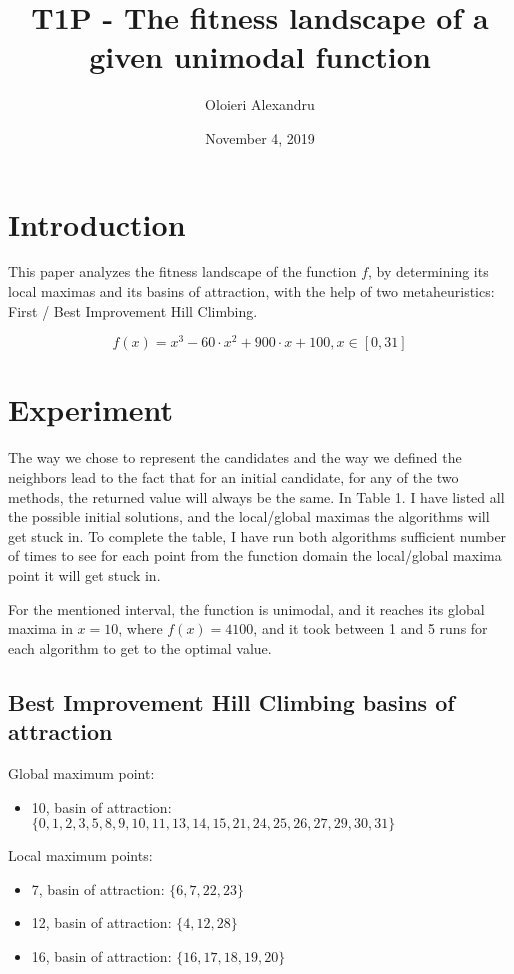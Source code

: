\documentclass[a4paper]{article}
\title{T1P - The fitness landscape of a given unimodal function}
\author{Oloieri Alexandru}
\date{November 4, 2019}
\begin{document}
	
\maketitle
	
\section{Introduction}

This paper analyzes the fitness landscape of the function $f$, by determining its local maximas and its basins of attraction, with the help of two metaheuristics: First / Best Improvement Hill Climbing.

$$f(x) = x^3 - 60 \cdot x^2 + 900 \cdot x + 100, x \in \left[0,31\right]$$

\section{Experiment}

The way we chose to represent the candidates and the way we defined the neighbors lead to the fact that for an initial candidate, for any of the two methods, the returned value will always be the same. In Table 1. I have listed all the possible initial solutions, and the local/global maximas the algorithms will get stuck in. To complete the table, I have run both algorithms sufficient number of times to see for each point from the function domain the local/global maxima point it will get stuck in.

For the mentioned interval, the function is unimodal, and it reaches its global maxima in $x=10$, where $f(x)=4100$, and it took between 1 and 5 runs for each algorithm to get to the optimal value.

\subsection{Best Improvement Hill Climbing basins of attraction}

Global maximum point: 
\begin{itemize}
	\item 10, basin of attraction: $\{0, 1, 2, 3, 5, 8, 9, 10, 11, 13, 14, 15, 21, 24, 25, 26, 27, 29, 30, 31\}$
\end{itemize}

Local maximum points:
\begin{itemize}
	\item 7, basin of attraction: $\{6, 7, 22, 23\}$
	\item 12, basin of attraction: $\{4, 12, 28\}$
	\item 16, basin of attraction: $\{16, 17, 18, 19, 20\}$
\end{itemize}
\end{document}
